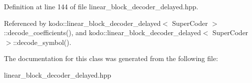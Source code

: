 Definition at line 144 of file linear\-\_\-block\-\_\-decoder\-\_\-delayed.\-hpp.



Referenced by kodo\-::linear\-\_\-block\-\_\-decoder\-\_\-delayed$<$ Super\-Coder $>$\-::decode\-\_\-coefficients(), and kodo\-::linear\-\_\-block\-\_\-decoder\-\_\-delayed$<$ Super\-Coder $>$\-::decode\-\_\-symbol().



The documentation for this class was generated from the following file\-:\begin{DoxyCompactItemize}
\item 
linear\-\_\-block\-\_\-decoder\-\_\-delayed.\-hpp\end{DoxyCompactItemize}

